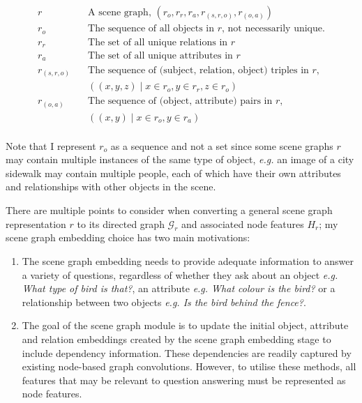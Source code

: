 \begin{align*}
    r \quad & \text{A scene graph, } (r_o, r_r, r_a, r_{(s,r,o)}, r_{(o, a)})\\
    r_o \quad  & \text{The sequence of all objects in \(r\), not necessarily unique.}\\
    r_r \quad & \text{The set of all unique relations in \(r\)}\\
    r_a \quad & \text{The set of all unique attributes in \(r\)}\\
    r_{(s,r,o)} \quad & \text{The sequence of (subject, relation, object) triples in } r,\\
    & ((x, y, z) \mid x \in r_o, y \in r_r, z \in r_o)\\
    r_{(o, a)} \quad & \text{The sequence of (object, attribute) pairs in \(r\),}\\
    & ((x, y) \mid x \in r_o, y \in r_a)\\
\end{align*}

Note that I represent \(r_o\) as a sequence and not a set since some scene graphs \(r\) may contain multiple instances of the same type of object, \textit{e.g.} an image of a city sidewalk may contain multiple people, each of which have their own attributes and relationships with other objects in the scene.

There are multiple points to consider when converting a general scene graph representation \(r\) to its directed graph \(\mathcal{G}_r\) and associated node features \(H_r\); my scene graph embedding choice has two main motivations:

\begin{enumerate}
    \item The scene graph embedding needs to provide adequate information to answer a variety of questions, regardless of whether they ask about an object \textit{e.g. What type of bird is that?}, an attribute \textit{e.g. What colour is the bird?} or a relationship between two objects \textit{e.g. Is the bird behind the fence?}.
    \item The goal of the scene graph module is to update the initial object, attribute and relation embeddings created by the scene graph embedding stage to include dependency information. These dependencies are readily captured by existing node-based graph convolutions. However, to utilise these methods, all features that may be relevant to question answering must be represented as node features.
\end{enumerate}

